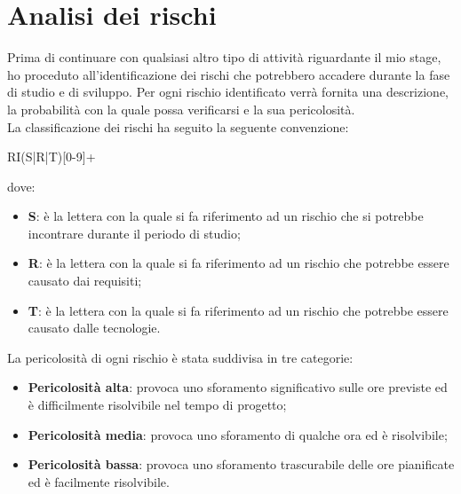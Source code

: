 
\section{Analisi dei rischi}
Prima di continuare con qualsiasi altro tipo di attività riguardante il mio stage, ho proceduto all'identificazione dei rischi che potrebbero accadere durante la fase di studio e di sviluppo. 
Per ogni rischio identificato verrà fornita una descrizione, la probabilità con la quale possa verificarsi e la sua pericolosità. \\

\noindent La classificazione dei rischi ha seguito la seguente convenzione:
\begin{center}
  RI(S|R|T)[0-9]+
\end{center}
dove:
\begin{itemize}
  \item \textbf{S}: è la lettera con la quale si fa riferimento ad un rischio che si potrebbe incontrare durante il periodo di studio;
  \item \textbf{R}: è la lettera con la quale si fa riferimento ad un rischio che potrebbe essere causato dai requisiti;
  \item \textbf{T}: è la lettera con la quale si fa riferimento ad un rischio che potrebbe essere causato dalle tecnologie.
\end{itemize}

\noindent La pericolosità di ogni rischio è stata suddivisa in tre categorie:
\begin{itemize}
  \item \textbf{Pericolosità alta}: provoca uno sforamento significativo sulle ore previste ed è difficilmente risolvibile nel tempo di progetto;
  \item \textbf{Pericolosità media}: provoca uno sforamento di qualche ora ed è risolvibile;
  \item \textbf{Pericolosità bassa}: provoca uno sforamento trascurabile delle ore pianificate ed è facilmente risolvibile.
\end{itemize}

